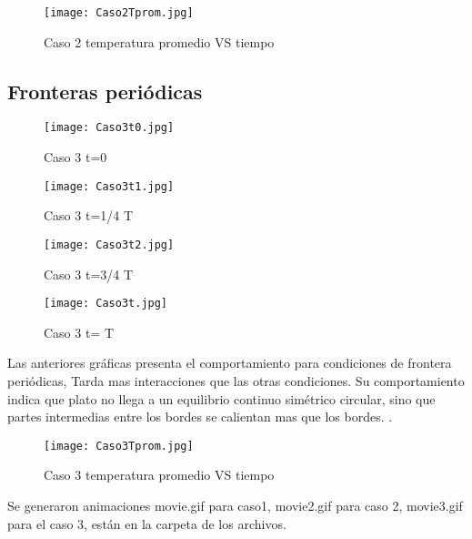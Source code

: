 \documentclass{article}
\begin{document}
\begin{figure}[h!]
\centering
\texttt{[image: Caso2Tprom.jpg]}
\caption{Caso 2 temperatura promedio VS tiempo}
\label{fig:14}
\end{figure}

\clearpage


\subsection{Fronteras periódicas}

\begin{figure}[h!]
\centering
\texttt{[image: Caso3t0.jpg]}
\caption{Caso 3 t=0}
\label{fig:9}
\end{figure}

\begin{figure}[h!]
\centering
\texttt{[image: Caso3t1.jpg]}
\caption{Caso 3 t=1/4 T}
\label{fig:10}
\end{figure}

\begin{figure}[h!]
\centering
\texttt{[image: Caso3t2.jpg]}
\caption{Caso 3 t=3/4 T}
\label{fig:11}
\end{figure}

\begin{figure}[h!]
\centering
\texttt{[image: Caso3t.jpg]}
\caption{Caso 3 t= T}
\label{fig:12}
\end{figure}

Las anteriores gráficas presenta el comportamiento para condiciones de frontera periódicas, Tarda mas interacciones que las otras condiciones. Su comportamiento indica que plato no llega a un equilibrio continuo simétrico circular, sino que partes intermedias entre los bordes se calientan mas que los bordes. .\\

\begin{figure}[h!]
\centering
\texttt{[image: Caso3Tprom.jpg]}
\caption{Caso 3 temperatura promedio VS tiempo}
\label{fig:15}
\end{figure}


Se generaron animaciones movie.gif para caso1, movie2.gif para caso 2, movie3.gif para el caso 3, están en la carpeta de los archivos.
\end{document}

